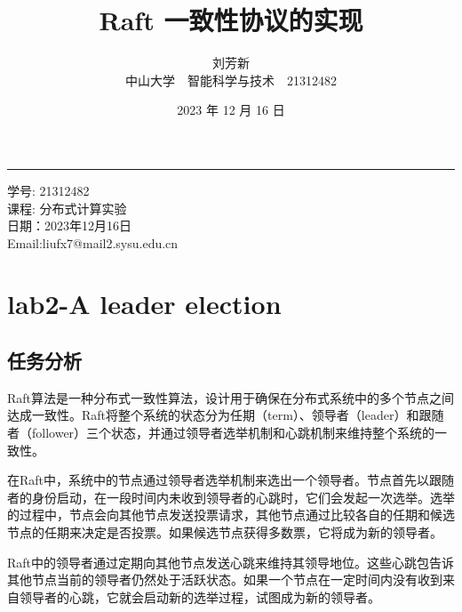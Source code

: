 \documentclass[]{article}
\title{Raft 一致性协议的实现}
\author{刘芳新\\ \footnotesize 中山大学~~智能科学与技术~~21312482}
\date{2023 年 12 月 16 日} %
\newcommand{\keywords}[1]{\textbf{Keywords：} #1}
\begin{document}
	\maketitle
	\thispagestyle{fancy} %
	
	\vfill
	\hrule
	\footnotesize
	\vspace{12pt} %
	\begin{minipage}{\textwidth}
		\raggedright %
		学号: 21312482 \\ 
		课程: 分布式计算实验 \\ 
		日期：2023年12月16日 \\ 
		Email:liufx7@mail2.sysu.edu.cn
	\end{minipage}
	\normalsize 
	\newpage %
	\tableofcontents %
	\newpage %
	\section{lab2-A leader election}
	\subsection{任务分析}
	Raft算法是一种分布式一致性算法，设计用于确保在分布式系统中的多个节点之间达成一致性。Raft将整个系统的状态分为任期（term）、领导者（leader）和跟随者（follower）三个状态，并通过领导者选举机制和心跳机制来维持整个系统的一致性。

	在Raft中，系统中的节点通过领导者选举机制来选出一个领导者。节点首先以跟随者的身份启动，在一段时间内未收到领导者的心跳时，它们会发起一次选举。选举的过程中，节点会向其他节点发送投票请求，其他节点通过比较各自的任期和候选节点的任期来决定是否投票。如果候选节点获得多数票，它将成为新的领导者。

	Raft中的领导者通过定期向其他节点发送心跳来维持其领导地位。这些心跳包告诉其他节点当前的领导者仍然处于活跃状态。如果一个节点在一定时间内没有收到来自领导者的心跳，它就会启动新的选举过程，试图成为新的领导者。
\end{document}
